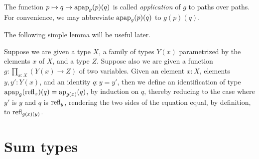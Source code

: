 The function $p \mapsto q \mapsto \apap g p q$ is called \emph{application} of $g$ to paths over paths.
For convenience, we may abbreviate $\apap g p q$ to $g(p)(q)$.

The following simple lemma will be useful later.

\begin{definition}\label{def:applfun2comp}
  Suppose we are given a type $X$, a family of types $Y(x)$ parametrized by the elements $x$ of $X$, and a type $Z$.  Suppose also we are given
  a function $g : \prod_{x:X} (Y(x) \to Z)$ of two variables.  Given an element $x:X$, elements $y, y':Y(x)$, and an identity $q : y = y'$, then
  we define an identification of type $\apap g {\refl x} q = \ap {g(x)}(q)$, by induction on $q$, thereby reducing to the case where $y'$ is
  $y$ and $q$ is $\mathrm{refl}_{y}$, rendering the two sides of the equation equal, by definition, to $\mathrm{refl}_{g(x)(y)}$.
\end{definition}

\section{Sum types}
\label{sec:sum-types}

